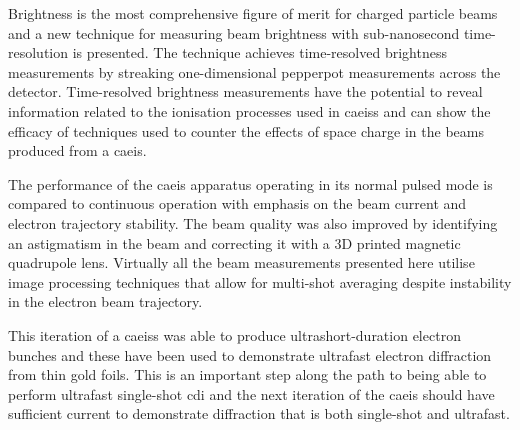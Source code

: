 Brightness is the most comprehensive figure of merit for charged particle beams and a new technique for measuring beam brightness with sub-nanosecond time-resolution is presented.
The technique achieves time-resolved brightness measurements by streaking one-dimensional pepperpot measurements across the detector.
Time-resolved brightness measurements have the potential to reveal information related to the ionisation processes used in \glspl{caeis} and can show the efficacy of techniques used to counter the effects of space charge in the beams produced from a \gls{caeis}.

The performance of the \gls{caeis} apparatus operating in its normal pulsed mode is compared to continuous operation with emphasis on the beam current and electron trajectory stability.
The beam quality was also improved by identifying an astigmatism in the beam and correcting it with a 3D printed magnetic quadrupole lens.
Virtually all the beam measurements presented here utilise image processing techniques that allow for multi-shot averaging despite instability in the electron beam trajectory.

This iteration of a \glspl{caeis} was able to produce ultrashort-duration electron bunches and these have been used to demonstrate ultrafast electron diffraction from thin gold foils.
This is an important step along the path to being able to perform ultrafast single-shot \gls{cdi} and the next iteration of the \gls{caeis} should have sufficient current to demonstrate diffraction that is both single-shot and ultrafast.